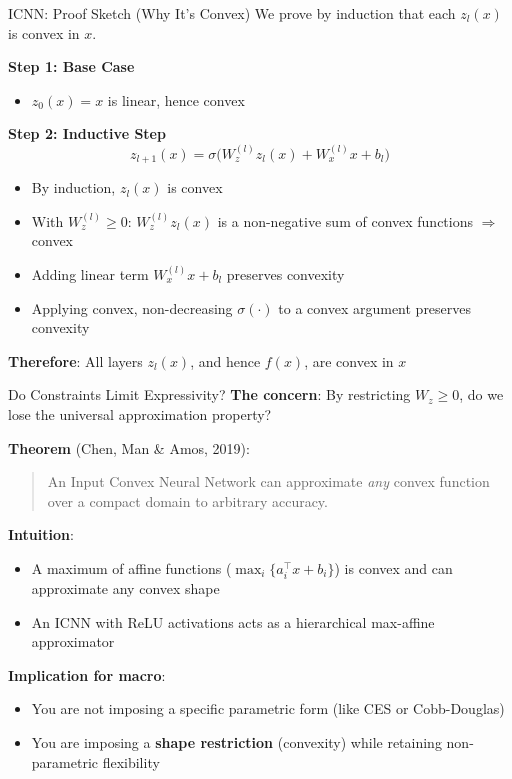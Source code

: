 \documentclass[10pt,english,aspectratio=169]{beamer}
\begin{document}
\begin{frame}{ICNN: Proof Sketch (Why It's Convex)}
We prove by induction that each $z_l(x)$ is convex in $x$.

\vspace{0.2cm}
\textbf{Step 1: Base Case}
\begin{itemize}
  \item $z_0(x) = x$ is linear, hence convex \checkmark
\end{itemize}

\vspace{0.2cm}
\textbf{Step 2: Inductive Step}
\[
  z_{l+1}(x) = \sigma\bigl(W_z^{(l)} z_l(x) + W_x^{(l)} x + b_l\bigr)
\]
\begin{itemize}
  \item By induction, $z_l(x)$ is convex
  \item With $W_z^{(l)} \geq 0$: $W_z^{(l)} z_l(x)$ is a non-negative sum of convex functions $\Rightarrow$ convex
  \item Adding linear term $W_x^{(l)} x + b_l$ preserves convexity
  \item Applying convex, non-decreasing $\sigma(\cdot)$ to a convex argument preserves convexity \checkmark
\end{itemize}

\vspace{0.15cm}
\textbf{Therefore}: All layers $z_l(x)$, and hence $f(x)$, are convex in $x$
\end{frame}


\begin{frame}{Do Constraints Limit Expressivity?}
\textbf{The concern}: By restricting $W_z \geq 0$, do we lose the universal approximation property?

\vspace{0.3cm}
\textbf{Theorem} (Chen, Man \& Amos, 2019):
\begin{quote}
An Input Convex Neural Network can approximate \emph{any} convex function over a compact domain to arbitrary accuracy.
\end{quote}

\vspace{0.2cm}
\textbf{Intuition}:
\begin{itemize}
  \item A maximum of affine functions ($\max_i\{a_i^\top x + b_i\}$) is convex and can approximate any convex shape
  \item An ICNN with ReLU activations acts as a hierarchical max-affine approximator
\end{itemize}

\textbf{Implication for macro}:
\begin{itemize}
  \item You are not imposing a specific parametric form (like CES or Cobb-Douglas)
  \item You are imposing a \textbf{shape restriction} (convexity) while retaining non-parametric flexibility
\end{itemize}
\end{frame}
\end{document}
